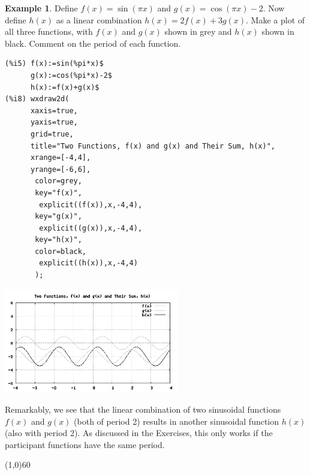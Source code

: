\documentclass[10.5pt,twoside]{report}
\theoremstyle{definition}
\newtheorem{exmp}{Example}[section]
\begin{document}
\begin{exmp}

Define $f(x)=\sin{(\pi x)}$ and $g(x)=\cos{(\pi x)}-2$.  Now define $h(x)$ as a linear combination $h(x)=2f(x)+3g(x)$.  Make a plot of all three functions, with $f(x)$ and $g(x)$ shown in grey and $h(x)$ shown in black.  Comment on the period of each function.\\

\begin{verbatim}
(%i5) f(x):=sin(%pi*x)$
      g(x):=cos(%pi*x)-2$
      h(x):=f(x)+g(x)$
(%i8) wxdraw2d(
      xaxis=true,
      yaxis=true,
      grid=true,
      title="Two Functions, f(x) and g(x) and Their Sum, h(x)",
      xrange=[-4,4],
      yrange=[-6,6],
       color=grey,
       key="f(x)",
        explicit((f(x)),x,-4,4),
       key="g(x)",
        explicit((g(x)),x,-4,4),
       key="h(x)",
       color=black,
        explicit((h(x)),x,-4,4)
       ); 
\end{verbatim}

\includegraphics[width=3in]{example_2_2_2}

\end{exmp}

Remarkably, we see that the linear combination of two sinusoidal functions $f(x)$ and $g(x)$ (both of period 2) results in another sinusoidal function $h(x)$ (also with period 2).  As discussed in the Exercises, this only works if the participant functions have the same period.

\line(1,0){60}
\linethickness{0.5mm}
\end{document}
